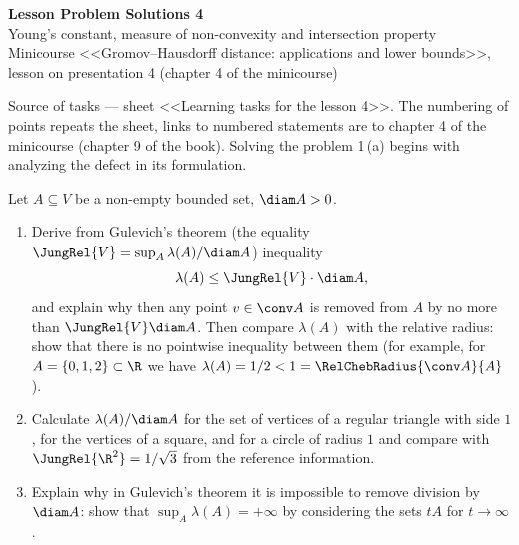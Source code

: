 \documentclass[a4paper,12pt]{report}
\begin{document}
\begin{center}
{\Large\bfseries Lesson Problem Solutions \textup{4}}\\[2mm]
{\large Young's constant, measure of non-convexity and intersection property}\\[1mm]
{\small Minicourse <<Gromov--Hausdorff distance: applications and lower bounds>>, lesson on presentation \textup{4} (chapter \textup{4} of the minicourse)}
\end{center}

Source of tasks --- sheet <<Learning tasks for the lesson \textup{4}>>. The numbering of points repeats the sheet, links to numbered statements are to chapter \textup{4} of the minicourse \textup{(}chapter \textup{9} of the book\textup{)}. Solving the problem \textup{1}\,\textup{(a)} begins with analyzing the defect in its formulation.

\begin{task}
Let $A \subseteq V$ be a non-empty bounded set, $\diam A > 0$.

\begin{enumerate}[label=\textup{(\alph*)}]
\item Derive from Gulevich's theorem \textup{(}the equality $\JungRel{V} = \sup_A \lambda(A)/\diam A$\textup{)} inequality
\[
\lambda(A) \le \JungRel{V} \cdot \diam A,
\]
and explain why then any point $v \in \conv A$ is removed from $A$ by no more than $\JungRel{V} \diam A$. Then compare $\lambda(A)$ with the relative radius\textup{:} show that there is no pointwise inequality between them \textup{(}for example, for $A = \{0, 1, 2\} \subset \R$ we have $\lambda(A) = 1/2 < 1 = \RelChebRadius{\conv A}{A}$\textup{)}.
\item Calculate $\lambda(A)/\diam A$ for the set of vertices of a regular triangle with side $1$, for the vertices of a square, and for a circle of radius $1$ and compare with $\JungRel{\R^2} = 1/\sqrt3$ from the reference information.
\item Explain why in Gulevich's theorem it is impossible to remove division by $\diam A$\textup{:} show that $\sup_A \lambda(A) = +\infty$ by considering the sets $tA$ for $t \to \infty$.
\end{enumerate}

\end{task}
\end{document}
